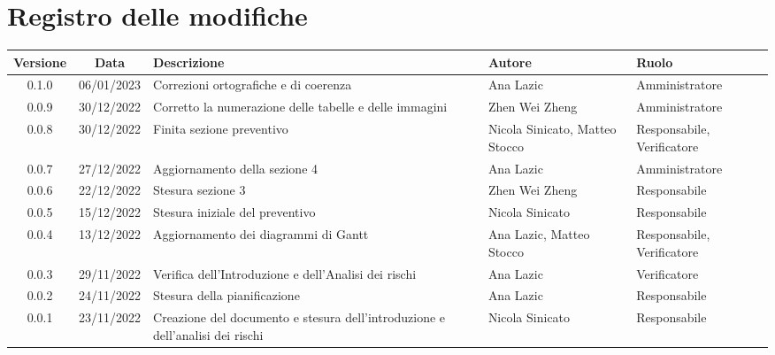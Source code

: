 \section*{Registro delle modifiche}
\begin{center}
	\renewcommand\tabularxcolumn[1]{>{\Centering}m{#1}}
	\begin{tabularx}{\textwidth}{| c | c | X | X | X |} 
		\hline
		\textbf{Versione} & \textbf{Data} & \textbf{Descrizione} & 	\textbf{Autore} & \textbf{Ruolo}\\
        \hline
	   0.1.0 & 06/01/2023 & Correzioni ortografiche e di coerenza & Ana Lazic & Amministratore \\
		\hline
		0.0.9 & 30/12/2022 & Corretto la numerazione delle tabelle e delle immagini & Zhen Wei Zheng & Amministratore\\
		\hline
		0.0.8 & 30/12/2022 & Finita sezione preventivo & Nicola Sinicato, Matteo Stocco & Responsabile, Verificatore\\
		\hline
		0.0.7 & 27/12/2022 & Aggiornamento della sezione 4 & Ana Lazic & 	Amministratore\\
		\hline
		0.0.6 & 22/12/2022 & Stesura sezione 3 & Zhen Wei Zheng & Responsabile\\
		\hline
		0.0.5 & 15/12/2022 & Stesura iniziale del preventivo & Nicola Sinicato & Responsabile\\
		\hline
		0.0.4 & 13/12/2022 & Aggiornamento dei diagrammi di Gantt & Ana Lazic, Matteo Stocco & Responsabile, Verificatore\\
		\hline
		0.0.3 & 29/11/2022 & Verifica dell'Introduzione e dell'Analisi dei rischi & Ana Lazic & Verificatore\\
		\hline
		0.0.2 & 24/11/2022 & Stesura della pianificazione & Ana Lazic & Responsabile\\
		\hline
		0.0.1 & 23/11/2022 & Creazione del documento e stesura dell'introduzione e dell'analisi dei rischi & Nicola Sinicato & Responsabile\\
		\hline
	\end{tabularx}
\end{center}
	
	

